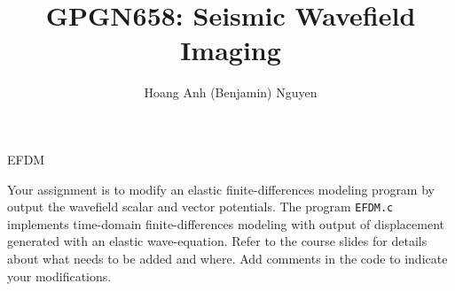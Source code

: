\author{Hoang Anh (Benjamin) Nguyen}
\title{GPGN658: Seismic Wavefield Imaging}{EFDM}

Your assignment is to modify an elastic finite-differences modeling
program by output the wavefield scalar and vector potentials.  The
program \texttt{EFDM.c} implements time-domain finite-differences
modeling with output of displacement generated with an elastic
wave-equation. Refer to the course slides for details about what needs
to be added and where. Add comments in the code to indicate your
modifications.






%


